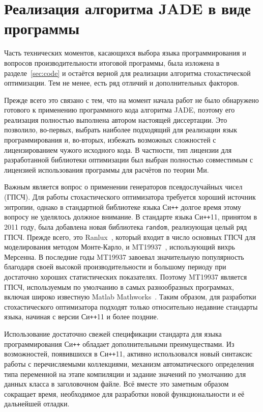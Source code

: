 \section{Реализация алгоритма JADE в виде программы}
\label{sec:jade}

Часть технических моментов, касающихся выбора языка программирования и
вопросов производительности итоговой программы, была изложена в
разделе~\ref{sec:code} и остаётся верной для реализации алгоритма
стохастической оптимизации. Тем не менее, есть ряд отличий и
дополнительных факторов.

Прежде всего это связано с тем, что на момент начала работ не было
обнаружено готового к применению программного кода алгоритма JADE, поэтому его
реализация полностью выполнена автором настоящей диссертации. Это
позволило, во-первых, выбрать наиболее подходящий для реализации язык
программирования и, во-вторых, избежать возможных сложностей с
лицензированием чужого исходного кода. В частности, тип лицензии для
разработанной библиотеки оптимизации был выбран полностью
совместимым с лицензией использования программы для расчётов по
теории Ми.

Важным является вопрос о применении генераторов псевдослучайных
чисел (ГПСЧ). Для работы стохастического оптимизатора требуется
хороший источник энтропии, однако в стандартной библиотеке языка
Си\texttt{++} долгое время этому вопросу не уделялось должное
внимание. В стандарте языка Си\texttt{++}11, принятом в 2011 году, была
добавлена новая библиотека \verb+random+, реализующая целый ряд
ГПСЧ. Прежде всего, это Ranlux~\cite{Luscher-RNG-Ranlux-1994}, который
входит в число основных ГПСЧ для моделирования методом Монте-Карло, и
MT19937~\cite{Matsumoto-RNG-MT-1998}, использующий вихрь Мерсенна. В
последние годы MT19937 завоевал значительную популярность благодаря
своей высокой производительности и большому периоду при достаточно
хороших статистических показателях. Поэтому MT19937 является ГПСЧ,
используемым по умолчанию в самых разнообразных программах, включая
широко известную Matlab Mathworks~\cite{Matlab-web}. Таким образом, для разработки
стохастического оптимизатора подходят только относительно недавние
стандарты языка, начиная с версии Си\texttt{++}11 и более поздние.

Использование достаточно свежей спецификации стандарта для языка
программирования Си\texttt{++} обладает дополнительными
преимуществами. Из возможностей, появившихся в Си\texttt{++}11,
активно использовался новый синтаксис работы с перечисляемыми
коллекциями, механизм автоматического определения типа переменной на
этапе компиляции и 
задание значений по умолчанию для данных класса в
заголовочном файле. Всё вместе это заметным образом сокращает время,
необходимое для разработки новой функциональности и её дальнейшей отладки.

